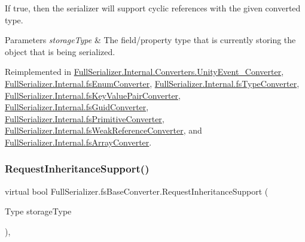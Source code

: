 If true, then the serializer will support cyclic references with the given converted type. 


\begin{DoxyParams}{Parameters}
{\em storage\+Type} & The field/property type that is currently storing the object that is being serialized.\\
\hline
\end{DoxyParams}


Reimplemented in \hyperlink{class_full_serializer_1_1_internal_1_1_converters_1_1_unity_event___converter_af4489bd5a993a32021e1ab24fcd6a42f}{Full\+Serializer.\+Internal.\+Converters.\+Unity\+Event\+\_\+\+Converter}, \hyperlink{class_full_serializer_1_1_internal_1_1fs_enum_converter_a9f297d3fbac4eecd05de362227a1161e}{Full\+Serializer.\+Internal.\+fs\+Enum\+Converter}, \hyperlink{class_full_serializer_1_1_internal_1_1fs_type_converter_a60f6421c5356bcf6954d3c888bbaf860}{Full\+Serializer.\+Internal.\+fs\+Type\+Converter}, \hyperlink{class_full_serializer_1_1_internal_1_1fs_key_value_pair_converter_a0a18762f776b7e00ab59d7827d3e50cc}{Full\+Serializer.\+Internal.\+fs\+Key\+Value\+Pair\+Converter}, \hyperlink{class_full_serializer_1_1_internal_1_1fs_guid_converter_aaeaf4b6d5206b2b70f0d9d2d79a5efe7}{Full\+Serializer.\+Internal.\+fs\+Guid\+Converter}, \hyperlink{class_full_serializer_1_1_internal_1_1fs_primitive_converter_a69a650703493e76171dff70be6ebec7c}{Full\+Serializer.\+Internal.\+fs\+Primitive\+Converter}, \hyperlink{class_full_serializer_1_1_internal_1_1fs_weak_reference_converter_a917bdcf70205871ef02577d31b3216f3}{Full\+Serializer.\+Internal.\+fs\+Weak\+Reference\+Converter}, and \hyperlink{class_full_serializer_1_1_internal_1_1fs_array_converter_a491c874399362934670610d5f232d6e6}{Full\+Serializer.\+Internal.\+fs\+Array\+Converter}.

\mbox{\label{class_full_serializer_1_1fs_base_converter_a84447285540ab6b51efc2399d144c60c}} 
\subsubsection{\texorpdfstring{Request\+Inheritance\+Support()}{RequestInheritanceSupport()}}
{\footnotesize\ttfamily virtual bool Full\+Serializer.\+fs\+Base\+Converter.\+Request\+Inheritance\+Support (\begin{DoxyParamCaption}\item[{Type}]{storage\+Type }\end{DoxyParamCaption})\hspace{0.3cm}{\ttfamily [inline]}, {\ttfamily [virtual]}}



